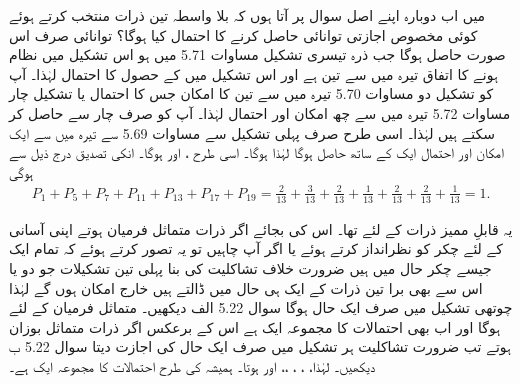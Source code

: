 میں اب دوبارہ اپنے اصل سوال پر آتا ہوں کہ بلا واسطہ تین ذرات منتخب کرتے ہوئے کوئی مخصوص اجازتی توانائی  حاصل کرنے کا احتمال  کیا ہوگا؟ توانائی  صرف اس صورت حاصل ہوگا جب ذرہ تیسری تشکیل مساوات \num{5.71} میں ہو اس تشکیل میں نظام ہونے کا اتفاق تیرہ میں سے تین ہے اور اس تشکیل میں  کے حصول کا احتمال  لہٰذا۔ آپ  کو تشکیل دو مساوات \num{5.70} تیرہ میں سے تین کا امکان جس کا احتمال  	یا تشکیل چار مساوات \num{5.72} تیرہ میں سے چھ امکان اور احتمال  لہٰذا۔ آپ  کو صرف چار سے حاصل کر سکتے ہیں لہٰذا۔ اسی طرح  صرف پہلی تشکیل سے مساوات \num{5.69} سے تیرہ میں سے ایک امکان اور احتمال ایک کے ساتھ حاصل ہوگا لہٰذا ہوگا۔ اسی طرح ،  اور  ہوگا۔ انکی تصدیق درج ذیل سے ہوگی 
\begin{align*}
	P_1 + P_5 + P_7 + P_{11} + P_{13} + P_{17} + P_{19} = \frac{2}{13} + \frac{3}{13} + \frac{2}{13} + \frac{1}{13} + \frac{2}{13} + \frac{2}{13} + \frac{1}{13} = 1.
\end{align*} 

یہ قابلِ ممیز ذرات کے لئے تھا۔ اس کی بجائے اگر ذرات متماثل فرمیان ہوتے اپنی آسانی کے لئے چکر کو  نظرانداز کرتے ہوئے یا اگر آپ چاہیں تو یہ تصور کرتے ہوئے کہ تمام ایک جیسے چکر حال میں ہیں ضرورت خلاف تشاکلیت کی بنا پہلی تین تشکیلات  جو دو یا اس سے بھی برا تین ذرات کے ایک ہی حال میں ڈالتے ہیں خارج امکان ہوں گے لہٰذا چوتھی تشکیل میں صرف ایک حال ہوگا سوال \num{5.22} الف دیکھیں۔ متماثل فرمیان کے لئے  ہوگا اور اب بھی احتمالات کا مجموعہ ایک ہے اس کے برعکس اگر ذرات متماثل بوزان ہوتے تب ضرورت تشاکلیت ہر تشکیل میں صرف ایک حال کی اجازت دیتا سوال \num{5.22} ب دیکھیں۔ لہٰذا، ، ، ،،  اور  ہوتا۔ ہمیشہ کی طرح احتمالات کا مجموعہ ایک ہے۔

